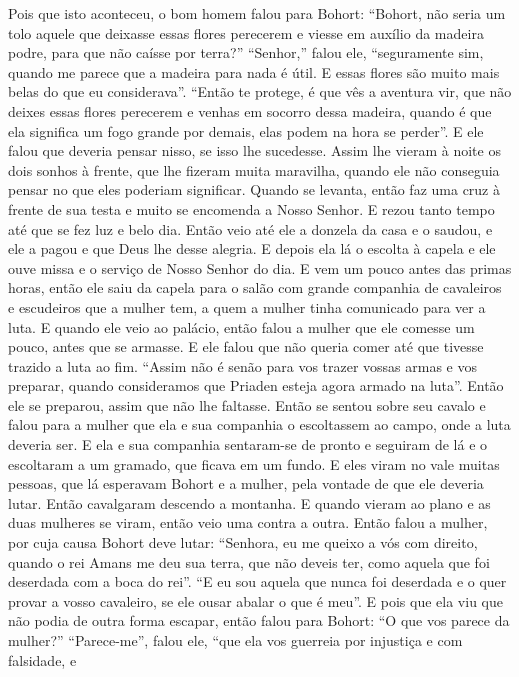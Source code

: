 Pois que isto aconteceu, o bom homem falou para Bohort: “Bohort, não seria um
tolo aquele que deixasse essas flores perecerem e viesse em auxílio da madeira
podre, para que não caísse por terra?” “Senhor,” falou ele, “seguramente sim,
quando me parece que a madeira para nada é útil. E essas flores são muito mais
belas do que eu considerava”. “Então te protege, é que vês a aventura vir, que
não deixes essas flores perecerem e venhas em socorro dessa madeira, quando é
que ela significa um fogo grande por demais, elas podem na hora se perder”. E
ele falou que deveria pensar nisso, se isso lhe sucedesse.
Assim lhe vieram à noite os dois sonhos à frente, que lhe fizeram muita
maravilha, quando ele não conseguia pensar no que eles poderiam significar.
Quando se levanta, então faz uma cruz à frente de sua testa e muito se
encomenda a Nosso Senhor. E rezou tanto tempo até que se fez luz e belo dia.
Então veio até ele a donzela da casa e o saudou, e ele a pagou e que Deus lhe
desse alegria. E depois ela lá o escolta à capela e ele ouve missa e o serviço
de Nosso Senhor do dia. E vem um pouco antes das primas horas, então ele saiu
da capela para o salão com grande companhia de cavaleiros e escudeiros que a
mulher tem, a quem a mulher tinha comunicado para ver a luta. E quando ele veio
ao palácio, então falou a mulher que ele comesse um pouco, antes que se
armasse. E ele falou que não queria comer até que tivesse trazido a luta ao
fim. “Assim não é senão para vos trazer vossas armas e vos preparar, quando
consideramos que Priaden esteja agora armado na luta”. Então ele se preparou,
assim que não lhe faltasse. Então se sentou sobre seu cavalo e falou para a
mulher que ela e sua companhia o escoltassem ao campo, onde a luta deveria ser.
E ela e sua companhia sentaram-se de pronto e seguiram de lá e o escoltaram a
um gramado, que ficava em um fundo. E eles viram no vale muitas pessoas, que lá
esperavam Bohort e a mulher, pela vontade de que ele deveria lutar. Então
cavalgaram descendo a montanha. E quando vieram ao plano e as duas mulheres se
viram, então veio uma contra a outra. Então falou a mulher, por cuja causa
Bohort deve lutar: “Senhora, eu me queixo a vós com direito, quando o rei Amans
me deu sua terra, que não deveis ter, como aquela que foi deserdada com a boca
do rei”. “E eu sou aquela que nunca foi deserdada e o quer provar a vosso
cavaleiro, se ele ousar abalar o que é meu”. E pois que ela viu que não podia
de outra forma escapar, então falou para Bohort: “O que vos parece da mulher?”
“Parece-me”, falou ele, “que ela vos guerreia por injustiça e com falsidade, e

